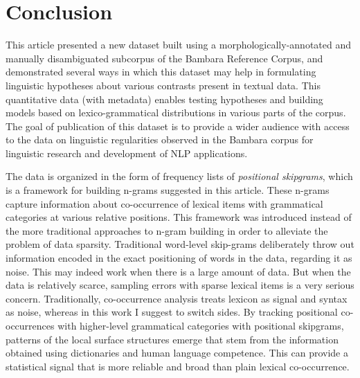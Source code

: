 \documentclass[12pt]{article}
\begin{document}


\section{Conclusion}

This article presented a new dataset built using
a morphologically-annotated and manually disambiguated subcorpus of the
Bambara Reference Corpus, and demonstrated several ways in which this
dataset may help in formulating linguistic hypotheses about various
contrasts present in textual data. This quantitative data (with
metadata) enables testing hypotheses and building models based on
lexico-grammatical distributions in various parts of the corpus.  The
goal of publication of this dataset is to provide a wider audience with
access to the data on linguistic regularities observed in the Bambara
corpus for linguistic research and development of NLP
applications.

The data is organized in the form of frequency lists of
\textit{positional skipgrams}, which is a framework for building
n-grams suggested in this article. These n-grams capture information
about co-occurrence of lexical items with grammatical categories at
various relative positions. This framework was introduced instead of
the more traditional approaches to n-gram building in order to
alleviate the problem of data sparsity. Traditional word-level
skip-grams deliberately throw out information encoded in the exact
positioning of words in the data, regarding it as noise. This may
indeed work when there is a large amount of data. But when the data is
relatively scarce, sampling errors with sparse lexical items is a very
serious concern. Traditionally, co-occurrence analysis treats lexicon
as signal and syntax as noise, whereas in this work I suggest to
switch sides. By tracking positional co-occurrences with higher-level
grammatical categories with positional skipgrams, patterns of the
local surface structures emerge that stem from the information
obtained using dictionaries and human language competence. This can
provide a statistical signal that is more reliable and broad than
plain lexical co-occurrence.
\end{document}
